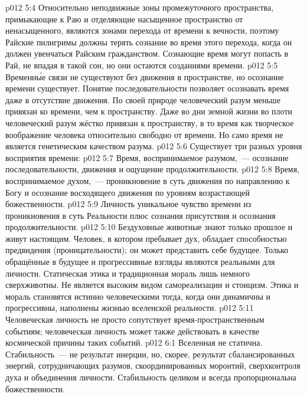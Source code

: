 \vs p012 5:4 Относительно неподвижные зоны промежуточного пространства, примыкающие к Раю и отделяющие насыщенное пространство от ненасыщенного, являются зонами перехода от времени к вечности, поэтому Райские пилигримы должны терять сознание во время этого перехода, когда он должен увенчаться Райским гражданством. Сознающие время  могут попасть в Рай, не впадая в такой сон, но они остаются созданиями времени.
\vs p012 5:5 \pc Временн\'ые связи не существуют без движения в пространстве, но осознание времени существует. Понятие последовательности позволяет осознавать время даже в отсутствие движения. По своей природе человеческий разум меньше привязан ко времени, чем к пространству. Даже во дни земной жизни во плоти человеческий разум жёстко привязан к пространству, в то время как творческое воображение человека относительно свободно от времени. Но само время не является генетическим качеством разума.
\vs p012 5:6 \pc Существует три разных уровня восприятия времени:
\vs p012 5:7 Время, воспринимаемое разумом,~--- осознание последовательности, движения и ощущение продолжительности.
\vs p012 5:8 Время, воспринимаемое духом,~--- проникновение в суть движения по направлению к Богу и осознание восходящего движения по уровням возрастающей божественности.
\vs p012 5:9 Личность  уникальное чувство времени из проникновения в суть Реальности плюс сознания присутствия и осознания продолжительности.
\vs p012 5:10 \pc Бездуховные животные знают только прошлое и живут настоящим. Человек, в котором пребывает дух, обладает способностью предвидения (проницательности); он может представить себе будущее. Только обращённые в будущее и прогрессивные взгляды являются реальными для личности. Статическая этика и традиционная мораль лишь немного сверхживотны. Не является высоким видом самореализации и стоицизм. Этика и мораль становятся истинно человеческими тогда, когда они динамичны и прогрессивны, наполнены жизнью вселенской реальности.
\vs p012 5:11 Человеческая личность не просто сопутствует время\hyp{}пространственным событиям; человеческая личность может также действовать в качестве космической причины таких событий.
\vs p012 6:1 Вселенная не статична. Стабильность~--- не результат инерции, но, скорее, результат сбалансированных энергий, сотрудничающих разумов, скоординированных моронтий, сверхконтроля духа и объединения личности. Стабильность целиком и всегда пропорциональна божественности.
